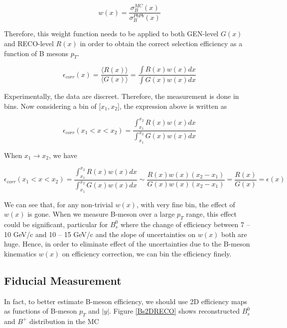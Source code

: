 \begin{equation}
w(x) = \frac{\sigma^{MC}_B (x)}{\sigma^{PbPb}_B (x)}
\end{equation}

Therefore, this weight function needs to be applied to both GEN-level $G(x)$ and RECO-level $R(x)$ in order to obtain the correct selection efficiency as a function of B mesons $p_T$. 


\begin{equation}
\epsilon_{corr}(x) =  \frac{\langle R(x) \rangle}{\langle G(x) \rangle}= \frac{\int R(x) w(x)dx}{\int G(x) w(x)dx}
\end{equation}

Experimentally, the data are discreet. Therefore, the measurement is done in bins. Now considering a bin of [$x_1,x_2$], the expression above is written as 

\begin{equation}
\epsilon_{corr}(x_1 < x < x_2) =  \frac{\int^{x_2}_{x_1} R(x) w(x)dx}{\int^{x_2}_{x_1} G(x) w(x)dx}
\end{equation}


When $x_1 \rightarrow x_2$, we have

\begin{equation}
\epsilon_{corr}(x_1 < x < x_2) =  \frac{\int^{x_2}_{x_1} R(x) w(x)dx}{\int^{x_2}_{x_1} G(x) w(x)dx} \sim  \frac{R(x) w(x)  (x_2 - x_1)}{G(x) w(x) (x_2 - x_1)}  = \frac{R(x)}{G(x)} = \epsilon(x)
\end{equation}

We can see that, for any non-trivial $w(x)$, with very fine bin, the effect of $w(x)$ is gone. When we measure B-meson over a large $p_T$ range, this effect could be significant, particular for $B^0_s$ where the change of efficiency between 7 -- 10 GeV/c and 10 -- 15 GeV/c and the slope of uncertainties on $w(x)$ both are huge. Hence, in order to eliminate effect of the uncertainties due to the B-meson kinematics $w(x)$ on efficiency correction, we can bin the efficiency finely.

\subsection{Fiducial Measurement}

In fact, to better estimate B-meson efficiency, we should use 2D efficiency maps as functions of B-meson $p_T$ and $|y|$. Figure \ref{Bs2DRECO} shows reconstructed $B^0_s$ and $B^+$ distribution in the MC

